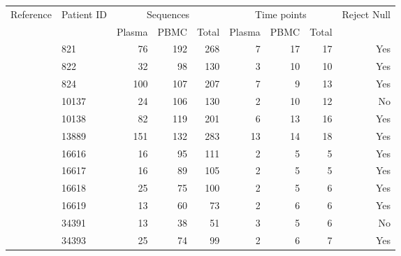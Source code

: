 \documentclass[12pt]{article}
\begin{document}
\begin{table}[!ht]
\def\arraystretch{1.3}%
\begin{center}
\begin{tabular}{llrrrrrrr} 

Reference & Patient ID & \multicolumn{3}{c}{Sequences} & \multicolumn{3}{c}{Time points} & Reject Null \\ 
 &  & Plasma & PBMC & Total & Plasma & PBMC & Total\\
\hline
\cite{Shankarappa99}%
& 821 &      76 &      192 &      268 &        7 &       17 &       17 &   Yes \\ 
& 822 &      32 &       98 &      130 &        3 &       10 &       10 &   Yes \\ 
& 824 &     100 &      107 &      207 &        7 &        9 &       13 &   Yes \\ 
& 10137 &     24 &      106 &      130 &        2 &       10 &       12 &   No \\ 
& 10138 &     82 &      119 &      201 &        6 &       13 &       16 &   Yes \\
& 13889 &    151 &      132 &      283 &       13 &       14 &       18 &   Yes \\ 
\cite{Llewellyn06} & 16616 &     16 &       95 &      111 &        2 &        5 &        5 &    Yes  \\ 
& 16617 &     16 &       89 &      105 &        2 &        5 &        5 &   Yes \\ 
& 16618 &     25 &       75 &      100 &        2 &        5 &        6 &   Yes \\ 
& 16619 &     13 &       60 &       73 &        2 &        6 &        6 &   Yes \\ 
\cite{Novitsky09}%
& 34391 &     13 &       38 &       51 &        3 &        5 &        6 &   No \\ 
& 34393 &     25 &       74 &       99 &        2 &        6 &        7 &   Yes  \\ 

\end{tabular}
\end{center}
\end{table}
\end{document}
